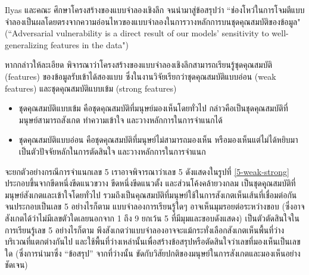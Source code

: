\documentclass{cpereport}
\begin{document}
Ilyas และคณะ \cite{1905.02175} ศึกษาโครงสร้างของแบบจำลองเชิงลึก จนนำมาสู่ข้อสรุปว่า ``ช่องโหว่ในการโจมตีแบบจำลองเป็นผลโดยตรงจากความอ่อนไหวของแบบจำลองในการวางหลักการบนชุดคุณสมบัติของข้อมูล" (``Adversarial vulnerability is a direct result of our models’ sensitivity to well-generalizing features in the data")

หากกล่าวให้ละเอียด พิจารณาว่าโครงสร้างของแบบจำลองเชิงลึกสามารถเรียนรู้ชุดคุณสมบัติ (features) ของข้อมูลรับเข้าได้สองแบบ ซึ่งในงานวิจัยเรียกว่าชุดคุณสมบัติแบบอ่อน (weak features) และชุดคุณสมบัติแบบเข้ม (strong features)

\begin{itemize}
    \item ชุดคุณสมบัติแบบเข้ม คือชุดคุณสมบัติที่มนุษย์มองเห็นโดยทั่วไป กล่าวคือเป็นชุดคุณสมบัติที่มนุษย์สามารถสังเกต ทำความเข้าใจ และวางหลักการในการจำแนกได้
    \item ชุดคุณสมบัติแบบอ่อน คือชุดคุณสมบัติที่มนุษย์ไม่สามารถมองเห็น หรือมองเห็นแต่ไม่ได้หยิบมาเป็นตัวปัจจัยหลักในการตัดสินใจ และวางหลักการในการจำแนก
\end{itemize}

จะยกตัวอย่างกรณีการจำแนกเลข 5 เราอาจพิจารณาว่าเลข 5 ดังแสดงในรูปที่ \ref{5-weak-strong} ประกอบขึ้นจากขีดหนึ่งขีดแนวขวาง ขีดหนึ่งขีดแนวตั้ง และส่วนโค้งคล้ายวงกลม เป็นชุดคุุณสมบัติที่มนุษย์สังเกตและเข้าใจโดยทั่วไป รวมถึงเป็นคุณสมบัติที่มนุษย์ใช้ในการสังเกตเห็นเส้นที่เชื่อมต่อกันจนประกอบเป็นเลข 5 อย่างไรก็ตาม แบบจำลองการเรียนรู้ใดๆ อาจเห็นมุมรอยต่อระหว่างขอบ (ซึ่งอาจสังเกตได้ว่าไม่มีเลขตัวใดเลยนอกจาก 1 ถึง 9 ยกเว้น 5 ที่มีมุมและขอบดังแสดง) เป็นตัวตัดสินใจในการเรียนรู้เลข 5 อย่างไรก็ตาม พึงสังเกตว่าแบบจำลองอาจจะแม้กระทั่งเลือกสังเกตเห็นพื้นที่ว่างบริเวณที่แตกต่างกันไป และใช้พื้นที่ว่างเหล่านั้นเพื่อสร้างข้อสรุปหรือตัดสินใจว่าเลขที่มองเห็นเป็นเลขใด (ซึ่งการนำมาซึ่ง ``ข้อสรุป'' จากที่ว่างนั้น ขัดกับวิสัยปกติของมนุษย์ในการสังเกตและมองเห็นอย่างชัดเจน)
 

\end{document}
